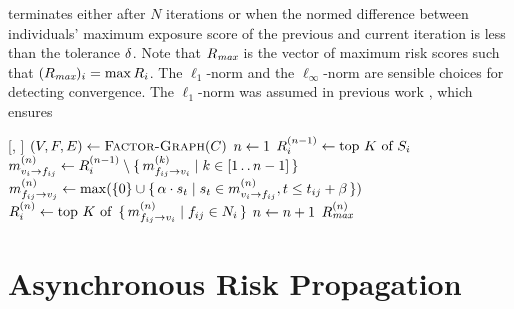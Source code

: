 \cSyncRiskProp{} terminates either after $N$ iterations or when the normed difference between individuals' maximum exposure score of the previous and current iteration is less than the tolerance $\diff$. Note that $\maxScores$ is the vector of maximum risk scores such that $(\maxScores)_i = \max \scores[i]$. The $\ell_1$-norm and the $\ell_\infty$-norm are sensible choices for detecting convergence. The $\ell_1$-norm was assumed in previous work \cite{Ayday2021}, which ensures 
%
\begin{function}[H]{\nSyncRiskProp}[\vScores, \vContacts]
\State $(\vVariables, \vFactors, \vEdges) \assign \Call{Factor-Graph}{\vContacts}$ \label{step:create-graph}
\State $n \leftarrow 1$ \label{step:init-iteration}
\ForEach{$\vVariable[i] \in \vVariables$} \label{step:start-score-init}
	\State $\iScores{i}{n - 1} \assign \topK{\vScores_i}$
\EndFor \label{step:end-score-init}
 \label{step:test-termination}
	\ForEach{$\{\vVariable[i], \vFactor[ij]\} \in \vEdges$} \label{step:start-send-variable-msgs}
		\State $\vVariableMsg[n]{i}{ij} \assign \iScores{i}{n - 1} \setminus \setBuilder{\vFactorMsg[k]{ij}{i}}{k \in [1 \ltwodots n - 1]}$
	\EndFor \label{step:end-send-variable-msgs}
	\ForEach{$\{\vVariable[i], \vFactor[ij]\} \in \vEdges$} \label{step:start-send-factor-msgs}
		\State $\vFactorMsg[n]{ij}{j} \assign \max (\{0\} \cup \setBuilder{\pTransRate \cdot \vScore_t}{\vScore_t \in \vVariableMsg[n]{i}{ij}, t \leq t_{ij} + \pTimeBuffer})$
	\EndFor \label{step:end-send-factor-msgs}
	\ForEach{$\vVariable[i] \in \vVariables$} \label{step:start-update-scores}
		\State $\iScores{i}{n} \assign \topK{\setBuilder{\vFactorMsg[n]{ij}{i}}{\vFactor[ij] \in \neighbors_i}}$
	\EndFor \label{step:end-update-scores}
	\State $n \leftarrow n + 1$ \label{step:update-iteration}
\EndWhile
\State \Return $\iMaxScores{n}$ \label{step:return-scores}
\end{function}

\section{Asynchronous Risk Propagation}\label{sec:asynchronous}


